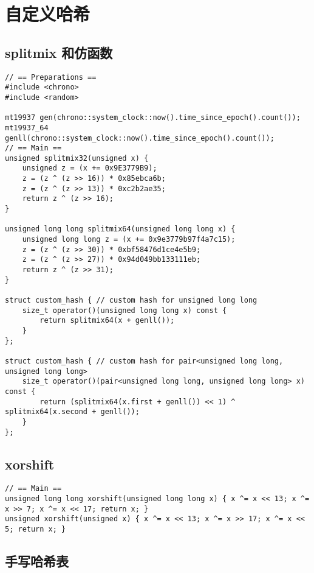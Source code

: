 \section{自定义哈希}

\subsection{splitmix 和仿函数}

\begin{verbatim}
// == Preparations ==
#include <chrono>
#include <random>

mt19937 gen(chrono::system_clock::now().time_since_epoch().count());
mt19937_64 genll(chrono::system_clock::now().time_since_epoch().count());
// == Main ==
unsigned splitmix32(unsigned x) {
    unsigned z = (x += 0x9E3779B9);
    z = (z ^ (z >> 16)) * 0x85ebca6b;
    z = (z ^ (z >> 13)) * 0xc2b2ae35;
    return z ^ (z >> 16);
}

unsigned long long splitmix64(unsigned long long x) {
    unsigned long long z = (x += 0x9e3779b97f4a7c15);
    z = (z ^ (z >> 30)) * 0xbf58476d1ce4e5b9;
    z = (z ^ (z >> 27)) * 0x94d049bb133111eb;
    return z ^ (z >> 31);
}

struct custom_hash { // custom hash for unsigned long long
    size_t operator()(unsigned long long x) const {
        return splitmix64(x + genll());
    }
};

struct custom_hash { // custom hash for pair<unsigned long long, unsigned long long>
    size_t operator()(pair<unsigned long long, unsigned long long> x) const {
        return (splitmix64(x.first + genll()) << 1) ^ splitmix64(x.second + genll());
    }
};
\end{verbatim}

\subsection{xorshift}

\begin{verbatim}
// == Main ==
unsigned long long xorshift(unsigned long long x) { x ^= x << 13; x ^= x >> 7; x ^= x << 17; return x; }
unsigned xorshift(unsigned x) { x ^= x << 13; x ^= x >> 17; x ^= x << 5; return x; }
\end{verbatim}

\subsection{手写哈希表}

